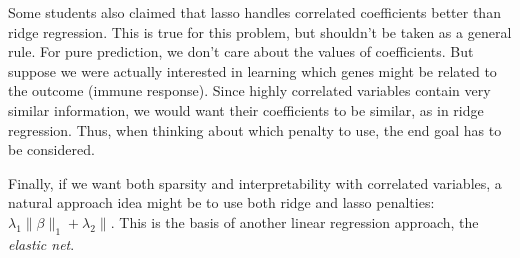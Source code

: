 \documentclass[12pt]{article}
\newcommand{\1}{\mathbbm{1}}
\begin{document}
\begin{enumerate}
Some students also claimed that lasso handles correlated coefficients better
than ridge regression. This is true for this problem, but shouldn't be taken as
a general rule. For pure prediction, we don't care about the values of
coefficients. But suppose we were actually interested in learning which genes
might be related to the outcome (immune response). Since highly correlated
variables contain very similar information, we would want their coefficients to
be similar, as in ridge regression. Thus, when thinking about which penalty to
use, the end goal has to be considered.

Finally, if we want both sparsity and interpretability with correlated
variables, a natural approach idea might be to use both ridge and lasso
penalties: $\lambda_1 \|\beta\|_1 + \lambda_2 \|$. This is the basis of another
linear regression approach, the \emph{elastic net}.
\end{enumerate}

\newpage
\end{document}
